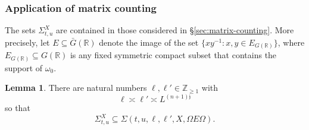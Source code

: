 \documentclass[reqno]{amsart}
\theoremstyle{plain} \newtheorem{theorem} {Theorem}
\theoremstyle{definition} \newtheorem{definition} [theorem] {Definition}
\theoremstyle{itplain} %
\newtheorem{lemma}[theorem]{Lemma}
\numberwithin{equation}{section}
\numberwithin{theorem}{section}
\renewcommand{\geq}{\geqslant}
\begin{document}
\subsubsection{Application of matrix counting}
The sets $\Sigma_{t,u}^X$ are contained in those considered in \S\ref{sec:matrix-counting}.  More precisely, let $E \subseteq \bar{G}(\mathbb{R})$ denote the image of the set $\{x y^{-1} : x,y \in E_{G(\mathbb{R})}\}$, where $E_{G(\mathbb{R})} \subseteq G(\mathbb{R})$ is any fixed symmetric compact subset that contains the support of $\omega_0$.
\begin{lemma}
  There are natural numbers $\ell, \ell' \in \mathbb{Z}_{\geq 1}$ with
  \begin{equation}\label{eq:ell-asymp-ell}
    \ell \asymp \ell ' \asymp L^{(n+1) \mathfrak{j}}
  \end{equation}
  so that
  \begin{equation}\label{eq:sigma_t-ux-subseteq}
    \Sigma_{t,u}^X \subseteq \Sigma(t,u,\ell, \ell', X, \Omega E \Omega).
  \end{equation}
\end{lemma}
\end{document}

